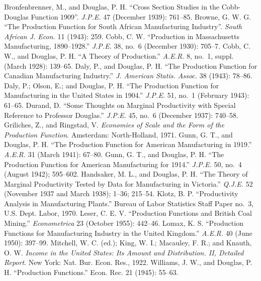 \documentclass{article}
\begin{document}
\begin{thebibliography}{00}
Bronfenbrenner, M., and Douglas, P. H. ``Cross Section Studies in the Cobb-Douglas Function 1909''. \emph{J.P.E.} 47 (December 1939): 761--85.
Browne, G. W. G. \foreignlanguage{english}{``The Production Function for South African Manufacturing Industry''. \emph{South African J. Econ.} 11 (1943): 259.}
Cobb, C. W. \foreignlanguage{english}{``Production in Massachusetts Manufacturing, 1890--1928.'' \emph{J.P.E.} 38, no.~6 (December 1930): 705--7.}
Cobb, C. W., and Douglas, P. H. \foreignlanguage{english}{``A Theory of Production.'' \emph{A.E.R.} 8, no.~1, suppl. (March 1928): 139--65.}
Daly, P., and Douglas, P. H. \foreignlanguage{english}{``The Production Function for Canadian Manufacturing Industry.'' \emph{J. American Statis. Assoc.} 38 (1943): 78--86.}
Daly, P.; Olson, E.; and Douglas, P. H. \foreignlanguage{english}{``The Production Function for Manufacturing in the United States in 1904.'' \emph{J.P.E.} 51, no.~1 (February 1943): 61--65.}
Durand, D. \foreignlanguage{english}{``Some Thoughts on Marginal Productivity with Special Reference to Professor Douglas.'' \emph{J.P.E.} 45, no.~6 (December 1937): 740--58.}
Griliches, Z., and Ringstad, V. \foreignlanguage{english}{\emph{Economies of Scale and the Form of the Production Function}. Amsterdam: North-Holland, 1971.}
Gunn, G. T., and Douglas, P. H. \foreignlanguage{english}{``The Production Function for American Manufacturing in 1919.'' \emph{A.E.R.} 31 (March 1941): 67--80.}
Gunn, G. T., and Douglas, P. H. \foreignlanguage{english}{``The Production Function for American Manufacturing for 1914.'' \emph{J.P.E.} 50, no.~4 (August 1942); 595--602.}
Handsaker, M. L., and Douglas, P. H. \foreignlanguage{english}{``The Theory of Marginal Productivity Tested by Data for Manufacturing in Victoria.'' \emph{Q.J.E.} 52 (November 1937 and March 1938); 1--36; 215--54.}
Klotz, B. P. \foreignlanguage{english}{``Productivity Analysis in Manufacturing Plants.'' Bureau of Labor Statistics Staff Paper no.~3, U.S. Dept. Labor, 1970.}
Leser, C. E. V. \foreignlanguage{english}{``Production Functions and British Coal Mining.'' \emph{Econometrica} 23 (October 1955): 442--46.}
Lomax, K. S. \foreignlanguage{english}{``Production Functions for Manufacturing Industry in the United Kingdom.'' \emph{A.E.R.} 40 (June 1950): 397--99.}
Mitchell, W. C. (ed.); King, W. I.; Macauley, F. R.; and Knauth, O. W. \foreignlanguage{english}{\emph{Income in the United States: Its Amount and Distribution. II, Detailed Report}. New York: Nat. Bur. Econ. Res., 1922.}
Williams, J. W., and Douglas, P. H. \foreignlanguage{english}{``Production Functions.'' Econ. Rec. 21 (1945): 55--63.}

\end{thebibliography}
\end{document}
